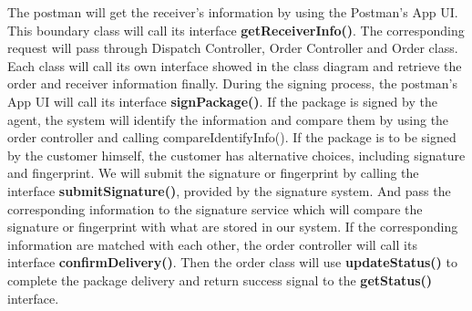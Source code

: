 \documentclass[12pt]{scrreprt}
\begin{document}
The postman will get the receiver’s information by using the Postman's App UI. This boundary class will call its interface \textbf{getReceiverInfo()}. The corresponding request will pass through Dispatch Controller, Order Controller and Order class. Each class will call its own interface showed in the class diagram and retrieve the order and receiver information finally. During the signing process, the postman's App UI will call its interface \textbf{signPackage()}. If the package is signed by the agent, the system will identify the information and compare them by using the order controller and calling compareIdentifyInfo(). If the package is to be signed by the customer himself, the customer has alternative choices, including signature and fingerprint. We will submit the signature or fingerprint by calling the interface \textbf{submitSignature()}, provided by the signature system. And pass the corresponding information to the signature service which will compare the signature or fingerprint with what are stored in our system. If the corresponding information are matched with each other, the order controller will call its interface \textbf{confirmDelivery()}. Then the order class will use \textbf{updateStatus()} to complete the package delivery and return success signal to the \textbf{getStatus()} interface.
\end{document}
